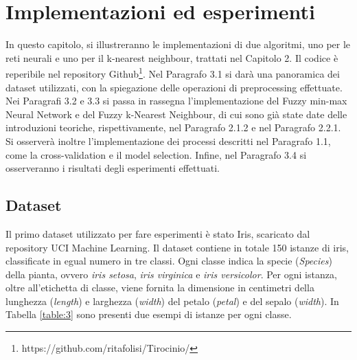 \documentclass[11pt,  oneside, openany]{book}
\begin{document}
\clearpage


	\chapter{Implementazioni ed esperimenti}

In questo capitolo, si illustreranno le implementazioni di due algoritmi, uno per le reti neurali e uno per il k-nearest neighbour, trattati nel Capitolo 2. Il codice è reperibile nel repository Github\footnote{https://github.com/ritafolisi/Tirocinio/}. Nel Paragrafo 3.1 si darà una panoramica dei dataset utilizzati, con la spiegazione delle operazioni di preprocessing effettuate. Nei Paragrafi 3.2 e 3.3 si passa in rassegna l'implementazione del Fuzzy min-max Neural Network e del Fuzzy k-Nearest Neighbour, di cui sono già state date delle introduzioni teoriche, rispettivamente, nel Paragrafo 2.1.2 e nel Paragrafo 2.2.1. Si osserverà inoltre l'implementazione dei processi descritti nel Paragrafo 1.1, come la cross-validation e il model selection. Infine, nel Paragrafo 3.4 si osserveranno i risultati degli esperimenti effettuati. 



	\section{Dataset}
Il primo dataset utilizzato per fare esperimenti è stato Iris, scaricato dal repository UCI Machine Learning. Il dataset contiene in totale 150 istanze di iris, classificate in egual numero in tre classi. Ogni classe indica la specie (\textit{Species}) della pianta, ovvero \textit{iris setosa}, \textit{iris virginica} e \textit{iris versicolor}. Per ogni istanza, oltre all'etichetta di classe, viene fornita la dimensione in centimetri della lunghezza (\textit{length}) e larghezza (\textit{width}) del petalo (\textit{petal}) e del sepalo (\textit{width}). In Tabella \ref{table:3} sono presenti due esempi di istanze per ogni classe. 
\end{document}
